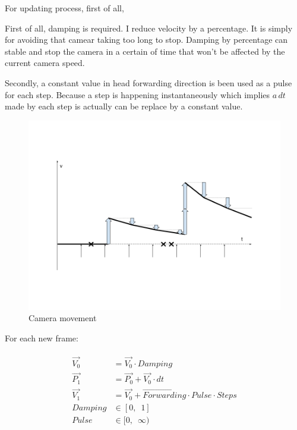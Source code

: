 For updating process, first of all, 

First of all, damping is required. I reduce velocity by a percentage. It is simply for avoiding that camear taking too long to stop. Damping by percentage can stable and stop the camera in a certain of time that won't be affected by the current camera speed. 


Secondly, a constant value in head forwarding direction is been used as a pulse for each step. Because a step is happening instantaneously which implies $a\,dt$ made by each step is actually can be replace by a constant value.

\begin{figure}[H]
\caption[camera-movement]{Camera movement}
\label{fig:camera-movement}
\centering
\includegraphics[width=\linewidth]{Figures/camera-movement.png}
\decoRule
\end{figure}

For each new frame:

\[
\begin{array}{lr}
\begin{aligned}
\overrightarrow{V_0} &= \overrightarrow{V_0} \cdot Damping \\
\overrightarrow{P_1} &= \overrightarrow{P_0} + \overrightarrow{V_0} \cdot dt \\
\overrightarrow{V_1} &= \overrightarrow{V_0} + \overrightarrow{Forwarding} \cdot Pulse \cdot Steps \\
Damping &\in [0,\enspace1] \\
Pulse &\in [0,\enspace \infty)
\end{aligned}
\end{array}
\]

